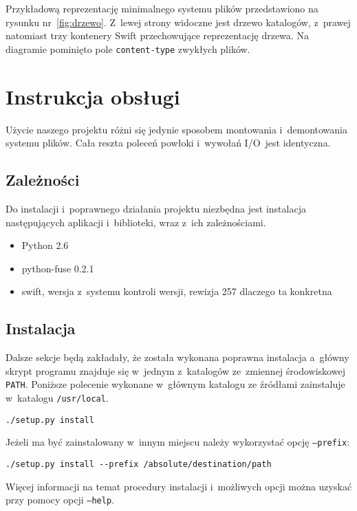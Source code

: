 Przykładową reprezentację minimalnego systemu plików przedstawiono na rysunku
nr~\ref{fig:drzewo}. Z~lewej strony widoczne jest drzewo katalogów, z~prawej
natomiast trzy kontenery Swift przechowujące reprezentację drzewa. Na diagramie
pominięto pole \texttt{content-type} zwykłych plików.

\section{Instrukcja obsługi}
Użycie naszego projektu różni się jedynie sposobem montowania i~demontowania
systemu plików. Cała reszta poleceń powłoki i~wywołań I/O~jest identyczna.

\subsection{Zależności}

Do instalacji i~poprawnego działania projektu \cb{} niezbędna jest instalacja
następujących aplikacji i~biblioteki, wraz z~ich zależnościami.

\begin{itemize}
	\item{Python 2.6}
	\item{python-fuse 0.2.1}
	\item{swift, wersja z~systemu kontroli wersji, rewizja 257 \todo dlaczego
		ta konkretna}
\end{itemize}

\subsection{Instalacja}

Dalsze sekcje będą zakładały, że została wykonana poprawna instalacja a~główny
skrypt programu znajduje się w~jednym z~katalogów ze~zmiennej środowiskowej
\texttt{PATH}. Poniższe polecenie wykonane w~głównym katalogu ze źródłami
zainstaluje \cb{} w~katalogu \texttt{/usr/local}.

\begin{verbatim}
./setup.py install
\end{verbatim}

Jeżeli \cb{} ma być zainstalowany w~innym miejscu należy wykorzystać opcję
\texttt{--prefix}:

\begin{verbatim}
./setup.py install --prefix /absolute/destination/path
\end{verbatim}

Więcej informacji na temat procedury instalacji i~możliwych opcji można uzyskać
przy pomocy opcji \texttt{--help}.

